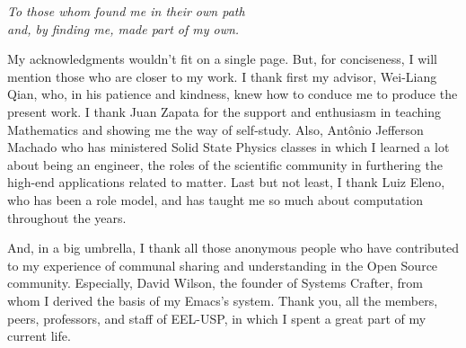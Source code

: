 \documentclass[
12pt,				%
openright,			%
oneside,			%
a4paper,			%
brazil,				%
english,			%
]{abntex2}
\begin{document}
\begin{dedicatoria}
   \vspace*{\fill}
   \centering
   \noindent
   \textit{To those whom found me in their own path\\
     and, by finding me, made part of my own.} \vspace*{\fill}
\end{dedicatoria}

\begin{agradecimentos}

  My acknowledgments wouldn't fit on a single page. But, for
  conciseness, I will mention those who are closer to my work. I thank
  first my advisor, Wei-Liang Qian, who, in his patience and kindness,
  knew how to conduce me to produce the present work. I thank Juan
  Zapata for the support and enthusiasm in teaching Mathematics and
  showing me the way of self-study. Also, Antônio Jefferson Machado
  who has ministered Solid State Physics classes in which I learned a
  lot about being an engineer, the roles of the scientific community
  in furthering the high-end applications related to matter. Last but
  not least, I thank Luiz Eleno, who has been a role model, and
  has taught me so much about computation throughout the years.

  And, in a big umbrella, I thank all those anonymous people who have contributed to my experience of communal sharing and understanding in the Open Source community. Especially, David Wilson, the founder of Systems Crafter, from whom I derived the basis of my Emacs's system.
  Thank you, all the members, peers, professors, and staff of EEL-USP, in which I spent a great part of my current life.
\end{agradecimentos}
\end{document}
